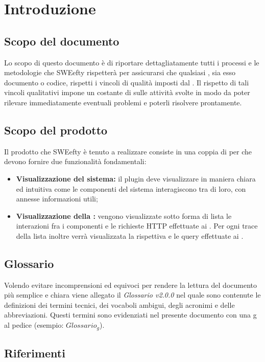 \section{Introduzione}
\label{sec:intro}
	\subsection{Scopo del documento}
	Lo scopo di questo documento è di riportare dettagliatamente tutti i processi e le metodologie che SWEefty rispetterà per assicurarsi che qualsiasi , sia esso documento o codice, rispetti i vincoli di qualità imposti dal .
	Il rispetto di tali vincoli qualitativi impone un costante  di  sulle attività svolte in modo da poter rilevare immediatamente eventuali problemi e poterli risolvere prontamente.
	
	\subsection{Scopo del prodotto}
	Il prodotto che SWEefty è tenuto a realizzare consiste in una coppia di  per  che devono fornire due funzionalità fondamentali:
	\begin{itemize}
		\item \textbf{Visualizzazione  del sistema:} il plugin deve visualizzare in maniera chiara ed intuitiva come le componenti del sistema interagiscono tra di loro, con annesse informazioni utili;
		\item \textbf{Visualizzazione della :} vengono visualizzate sotto forma di lista le interazioni fra i componenti e le richieste HTTP effettuate ai . Per ogni trace della lista inoltre verrà visualizzata la rispettiva  e le query effettuate ai .
	\end{itemize}

	\subsection{Glossario}
	Volendo evitare incomprensioni  ed equivoci per rendere la lettura del documento più semplice e chiara viene allegato il \emph{Glossario v2.0.0} nel quale sono contenute le definizioni dei termini tecnici, dei vocaboli ambigui, degli acronimi e delle abbreviazioni. Questi termini sono evidenziati nel presente documento con una g al pedice (esempio: $Glossario_{g}$).
	\subsection{Riferimenti}
